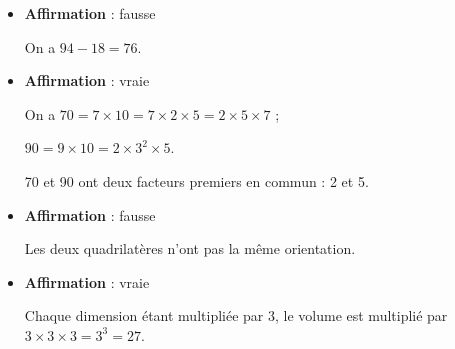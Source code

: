 
\medskip 

%

\begin{itemize}[label=$\bullet~~$]
\item \textbf{Affirmation } : fausse

On a $94 - 18 = 76$.%
%

\item \textbf{Affirmation } : vraie

On a $70 = 7 \times 10 = 7 \times 2 \times 5 = 2 \times 5 \times 7$ ;

$90 = 9 \times 10 = 2 \times 3^2 \times 5$.

70 et 90 ont deux facteurs premiers en commun : 2 et 5.

\item \textbf{Affirmation } : fausse

Les deux quadrilatères n'ont pas la même orientation.
\item \textbf{Affirmation } : vraie

Chaque dimension étant multipliée par 3, le volume est multiplié par $3 \times 3 \times 3 = 3^3 = 27$.
\end{itemize}

\vspace{0,5cm}

